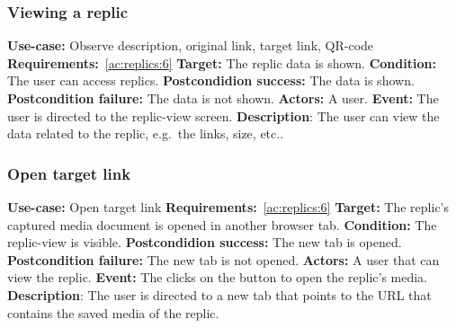 \subsubsection{Viewing a replic}\label{subsubsec:view-replic}
\textbf{Use-case:} Observe description, original link, target link, QR-code \newline
\textbf{Requirements:}~\ref{ac:replics:6} \newline
\textbf{Target:} The replic data is shown. \newline
\textbf{Condition:} The user can access replics. \newline
\textbf{Postcondidion success:} The data is shown. \newline
\textbf{Postcondition failure:} The data is not shown. \newline
\textbf{Actors:} A user. \newline
\textbf{Event:} The user is directed to the replic-view screen. \newline
\textbf{Description}: The user can view the data related to the replic, e.g.\ the links, size, etc..

\subsubsection{Open target link}\label{subsubsec:open-target-link}
\textbf{Use-case:} Open target link \newline
\textbf{Requirements:}~\ref{ac:replics:6}\newline
\textbf{Target:} The replic's captured media document is opened in another browser tab. \newline
\textbf{Condition:} The replic-view is visible. \newline
\textbf{Postcondidion success:} The new tab is opened. \newline
\textbf{Postcondition failure:} The new tab is not opened. \newline
\textbf{Actors:} A user that can view the replic. \newline
\textbf{Event:} The clicks on the button to open the replic's media. \newline
\textbf{Description}: The user is directed to a new tab that points to the URL that contains the saved media of the replic.

